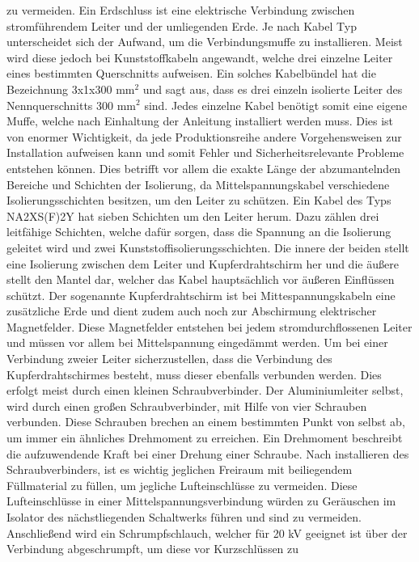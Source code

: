 zu vermeiden. Ein Erdschluss ist eine elektrische Verbindung zwischen stromführendem Leiter und der umliegenden Erde. Je nach Kabel Typ unterscheidet sich der 
Aufwand, um die Verbindungsmuffe zu installieren. Meist wird diese jedoch bei Kunststoffkabeln angewandt, welche drei einzelne Leiter eines bestimmten 
Querschnitts aufweisen. Ein solches Kabelbündel hat die Bezeichnung 3x1x300 mm$^2$ und sagt aus, dass es drei einzeln isolierte Leiter des Nennquerschnitts 
300 mm$^2$ sind. %
Jedes einzelne Kabel benötigt somit eine eigene Muffe, welche nach Einhaltung der Anleitung installiert werden muss. Dies ist von enormer Wichtigkeit, da jede 
Produktionsreihe andere Vorgehensweisen zur Installation aufweisen kann und somit Fehler und Sicherheitsrelevante Probleme entstehen können. Dies betrifft 
vor allem die exakte Länge der abzumantelnden Bereiche und Schichten der Isolierung, da Mittelspannungskabel verschiedene Isolierungsschichten besitzen, um 
den Leiter zu schützen. Ein Kabel des Typs NA2XS(F)2Y hat \zB sieben Schichten um den Leiter herum. Dazu zählen drei leitfähige Schichten, welche dafür 
sorgen, dass die Spannung an die Isolierung geleitet wird und zwei Kunststoffisolierungsschichten. Die innere der beiden stellt eine Isolierung zwischen dem 
Leiter und Kupferdrahtschirm her und die äußere stellt den Mantel dar, welcher das Kabel hauptsächlich vor äußeren Einflüssen schützt. Der sogenannte 
Kupferdrahtschirm ist bei Mittespannungskabeln eine zusätzliche Erde und dient zudem auch noch zur Abschirmung elektrischer Magnetfelder. Diese Magnetfelder 
entstehen bei jedem stromdurchflossenen Leiter und müssen vor allem bei Mittelspannung eingedämmt werden. Um bei einer Verbindung zweier Leiter 
sicherzustellen, dass die Verbindung des Kupferdrahtschirmes besteht, muss dieser ebenfalls verbunden werden. Dies erfolgt meist durch einen kleinen 
Schraubverbinder. Der Aluminiumleiter selbst, wird durch einen großen Schraubverbinder, mit Hilfe von vier Schrauben verbunden. Diese Schrauben brechen an 
einem bestimmten Punkt von selbst ab, um immer ein ähnliches Drehmoment zu erreichen. Ein Drehmoment beschreibt die aufzuwendende Kraft bei einer Drehung 
einer Schraube. Nach installieren des Schraubverbinders, ist es wichtig jeglichen Freiraum mit beiliegendem Füllmaterial zu füllen, um jegliche 
Lufteinschlüsse zu vermeiden. Diese Lufteinschlüsse in einer Mittelspannungsverbindung würden zu Geräuschen im Isolator des nächstliegenden Schaltwerks führen 
und sind zu vermeiden. Anschließend wird ein Schrumpfschlauch, welcher für 20 kV geeignet ist über der Verbindung abgeschrumpft, um diese vor Kurzschlüssen zu 
